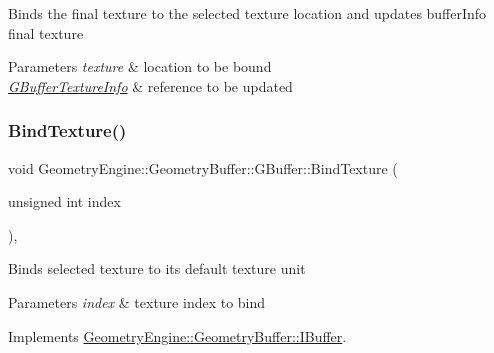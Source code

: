 Binds the final texture to the selected texture location and updates buffer\+Info final texture 
\begin{DoxyParams}{Parameters}
{\em texture} & location to be bound \\
\hline
{\em \mbox{\hyperlink{class_geometry_engine_1_1_g_buffer_texture_info}{G\+Buffer\+Texture\+Info}}} & reference to be updated \\
\hline
\end{DoxyParams}
\mbox{\label{class_geometry_engine_1_1_geometry_buffer_1_1_g_buffer_a2c9c631c31f0bda3c9f01c4402819e4b}} 
\subsubsection{\texorpdfstring{BindTexture()}{BindTexture()}\hspace{0.1cm}{\footnotesize\ttfamily [1/4]}}
{\footnotesize\ttfamily void Geometry\+Engine\+::\+Geometry\+Buffer\+::\+G\+Buffer\+::\+Bind\+Texture (\begin{DoxyParamCaption}\item[{unsigned int}]{index }\end{DoxyParamCaption})\hspace{0.3cm}{\ttfamily [override]}, {\ttfamily [virtual]}}

Binds selected texture to its default texture unit 
\begin{DoxyParams}{Parameters}
{\em index} & texture index to bind \\
\hline
\end{DoxyParams}


Implements \mbox{\hyperlink{class_geometry_engine_1_1_geometry_buffer_1_1_i_buffer_a3fba26797c5d4033b559c01d6f62dab5}{Geometry\+Engine\+::\+Geometry\+Buffer\+::\+I\+Buffer}}.

\mbox{\label{class_geometry_engine_1_1_geometry_buffer_1_1_g_buffer_a9a6d75cdb98cc00e34648f5f423382f1}} 
